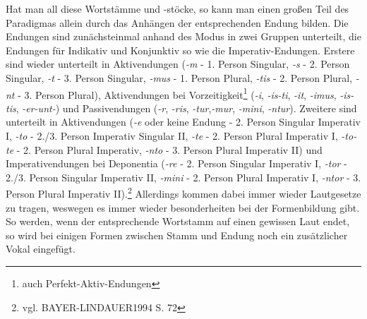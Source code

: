 \documentclass[12pt,abstract=on,titlepage,bibliography=totoc,ngerman,listof=totoc]{scrreprt}
\begin{document}
Hat man all diese Wortstämme und -stöcke, so kann man einen großen Teil des Paradigmas allein durch das Anhängen der entsprechenden Endung bilden. Die Endungen sind zunächsteinmal anhand des Modus in zwei Gruppen unterteilt, die Endungen für Indikativ und Konjunktiv so wie die Imperativ-Endungen. Erstere sind wieder unterteilt in Aktivendungen (\textit{-m} - 1. Person Singular, \textit{-s} - 2. Person Singular, \textit{-t} - 3. Person Singular, \textit{-mus} - 1. Person Plural, \textit{-tis} - 2. Person Plural, \textit{-nt} - 3. Person Plural), Aktivendungen bei Vorzeitigkeit\footnote{auch Perfekt-Aktiv-Endungen} (\textit{-i}, \textit{-is-ti}, \textit{-it}, \textit{-imus}, \textit{-is-tis}, \textit{-er-unt-}) und Passivendungen (\textit{-r}, \textit{-ris}, \textit{-tur},\textit{-mur}, \textit{-mini}, \textit{-ntur}). Zweitere sind unterteilt in Aktivendungen (\textit{-e} oder keine Endung - 2. Person Singular Imperativ I, \textit{-to} - 2./3. Person Imperativ Singular II, \textit{-te} - 2. Person Plural Imperativ I, \textit{-to-te} - 2. Person Plural Imperativ, \textit{-nto} - 3. Person Plural Imperativ II) und Imperativendungen bei Deponentia (\textit{-re} - 2. Person Singular Imperativ I, \textit{-tor} - 2./3. Person Singular Imperativ II, \textit{-mini} - 2. Person Plural Imperativ I, \textit{-ntor} - 3. Person Plural Imperativ II).\footnote{vgl. BAYER-LINDAUER1994 S. 72} Allerdings kommen dabei immer wieder Lautgesetze zu tragen, weswegen es immer wieder besonderheiten bei der Formenbildung gibt. So werden, wenn der entsprechende Wortstamm auf einen gewissen Laut endet, so wird bei einigen Formen zwischen Stamm und Endung noch ein zusätzlicher Vokal eingefügt. \par
\end{document}
